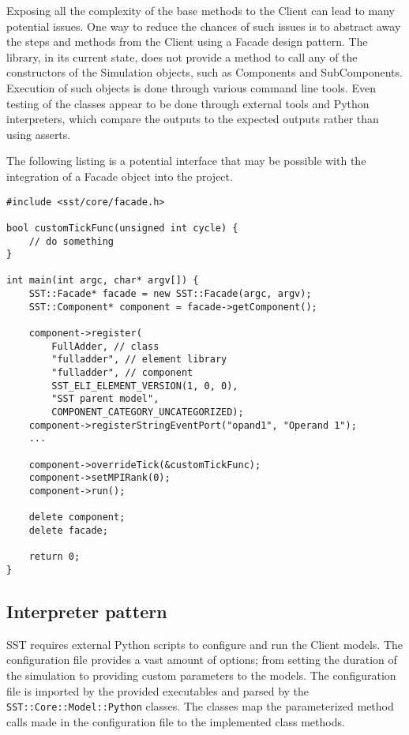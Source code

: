 Exposing all the complexity of the base methods to the Client can lead to many potential issues. One way to reduce the chances of such issues is to abstract away the steps and methods from the Client using a Facade design pattern. The library, in its current state, does not provide a method to call any of the constructors of the Simulation objects, such as Components and SubComponents. Execution of such objects is done through various command line tools. Even testing of the classes appear to be done through external tools and Python interpreters, which compare the outputs to the expected outputs rather than using asserts.

The following listing is a potential interface that may be possible with the integration of a Facade object into the project.

\begin{lstlisting}[style=customC++]
#include <sst/core/facade.h>

bool customTickFunc(unsigned int cycle) {
    // do something
}

int main(int argc, char* argv[]) {
    SST::Facade* facade = new SST::Facade(argc, argv);
    SST::Component* component = facade->getComponent();

    component->register(
        FullAdder, // class
        "fulladder", // element library
        "fulladder", // component
        SST_ELI_ELEMENT_VERSION(1, 0, 0),
        "SST parent model",
        COMPONENT_CATEGORY_UNCATEGORIZED);
    component->registerStringEventPort("opand1", "Operand 1");
    ...

    component->overrideTick(&customTickFunc);
    component->setMPIRank(0);
    component->run();

    delete component;
    delete facade;

    return 0;
}
\end{lstlisting}

\subsection{Interpreter pattern}
SST requires external Python scripts to configure and run the Client models. The configuration file provides a vast amount of options; from setting the duration of the simulation to providing custom parameters to the models. The configuration file is imported by the provided executables and parsed by the \texttt{SST::Core::Model::Python} classes. The classes map the parameterized method calls made in the configuration file to the implemented class methods.

